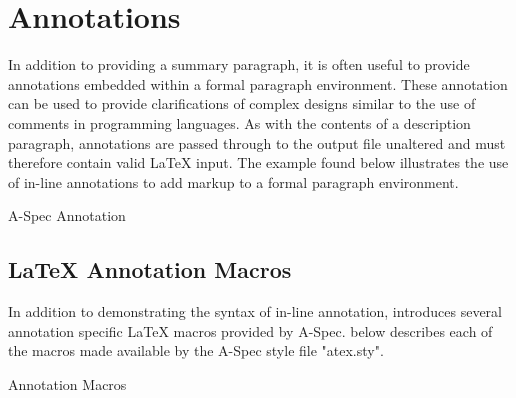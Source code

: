 \documentclass[letterpaper,10pt,draft]{book}
\begin{document}
\section{Annotations}
   \label{sect:Annotations}

In addition to providing a summary paragraph, it is often useful to provide annotations
embedded within a formal paragraph environment.  These annotation can be used to
provide clarifications of complex designs similar to the use of comments in programming
languages.  As with the contents of a description paragraph, annotations are passed
through to the output file unaltered and must therefore contain valid \LaTeX{} input.
The example found below illustrates the use of in-line annotations to add markup
to a formal paragraph environment.

\begin{example}
\begin{minipage}[t]{0.55\linewidth}
   
\end{minipage}
\begin{minipage}[t]{0.44\linewidth}
   \azsch
   
\end{minipage}

   \caption{A-Spec Annotation}
   \label{ex:Annotation}
\end{example}

\subsection{\LaTeX{} Annotation Macros}
   \label{sect:AnnoTeX}

In addition to demonstrating the syntax of in-line annotation, 
introduces several annotation specific \LaTeX{} macros provided by A-Spec.  
below describes each of the macros made available by the A-Spec style file "atex.sty".

\begin{example}
\begin{minipage}[t]{0.55\linewidth}
   
\end{minipage}
\begin{minipage}[t]{0.44\linewidth}
   \azsch
   
\end{minipage}

   \caption{Annotation Macros}
   \label{ex:AnnoTeX}
\end{example}
\end{document}
